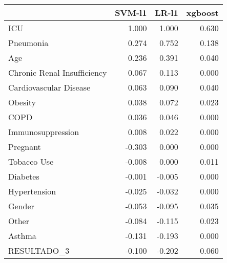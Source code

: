 \begin{tabular}{lrrr}
\toprule
{} &  SVM-l1 &  LR-l1 &  xgboost \\
\midrule
ICU                         &   1.000 &  1.000 &    0.630 \\
Pneumonia                   &   0.274 &  0.752 &    0.138 \\
Age                         &   0.236 &  0.391 &    0.040 \\
Chronic Renal Insufficiency &   0.067 &  0.113 &    0.000 \\
Cardiovascular Disease      &   0.063 &  0.090 &    0.040 \\
Obesity                     &   0.038 &  0.072 &    0.023 \\
COPD                        &   0.036 &  0.046 &    0.000 \\
Immunosuppression           &   0.008 &  0.022 &    0.000 \\
Pregnant                    &  -0.303 &  0.000 &    0.000 \\
Tobacco Use                 &  -0.008 &  0.000 &    0.011 \\
Diabetes                    &  -0.001 & -0.005 &    0.000 \\
Hypertension                &  -0.025 & -0.032 &    0.000 \\
Gender                      &  -0.053 & -0.095 &    0.035 \\
Other                       &  -0.084 & -0.115 &    0.023 \\
Asthma                      &  -0.131 & -0.193 &    0.000 \\
RESULTADO\_3                 &  -0.100 & -0.202 &    0.060 \\
\bottomrule
\end{tabular}

